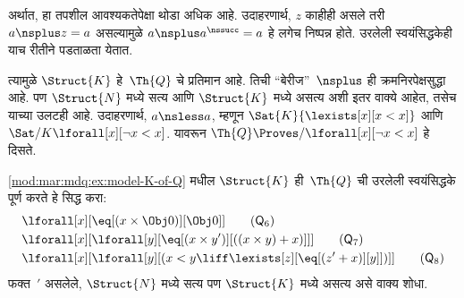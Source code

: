 \begin{ex}
अर्थात, हा तपशील आवश्यकतेपेक्षा थोडा अधिक आहे. उदाहरणार्थ,
$z$ काहीही असले तरी $a \nsplus z = a$ असल्यामुळे
$a \nsplus a^\nssucc = a$ हे लगेच निष्पन्न होते. उरलेली स्वयंसिद्धकेही
याच रीतीने पडताळता येतात.

त्यामुळे $\Struct{K}$ हे~$\Th{Q}$ चे प्रतिमान आहे. तिची ``बेरीज''~$\nsplus$
ही क्रमनिरपेक्षसुद्धा आहे. पण $\Struct{N}$ मध्ये सत्य आणि $\Struct{K}$
मध्ये असत्य अशी इतर वाक्ये आहेत, तसेच याच्या उलटही आहे. उदाहरणार्थ,
$a \nsless a$, म्हणून $\Sat{K}{\lexists[x][x < x]}$ आणि
$\Sat/{K}{\lforall[x][\lnot x<x]}$. यावरून $\Th{Q} \Proves/
\lforall[x][\lnot x < x]$ हे दिसते.
\end{ex}

\begin{prob}
\ref{mod:mar:mdq:ex:model-K-of-Q} मधील $\Struct{K}$ ही~$\Th{Q}$ ची
उरलेली स्वयंसिद्धके पूर्ण करते हे सिद्ध करा:
\begin{align*}
  & \lforall[x][\eq[(x \times \Obj 0)][\Obj 0]] \tag{$\mathsf{Q}_6$}\\
  & \lforall[x][\lforall[y][\eq[(x \times y')][((x \times y) + x)]]] \tag{$\mathsf{Q}_7$}\\
  & \lforall[x][\lforall[y][(x < y \liff \lexists[z][\eq[(z' + x)][y]])]] \tag{$\mathsf{Q}_8$}
\end{align*}
फक्त~$\prime$ असलेले, $\Struct{N}$ मध्ये सत्य पण $\Struct{K}$ मध्ये असत्य
असे वाक्य शोधा.
\end{prob}

